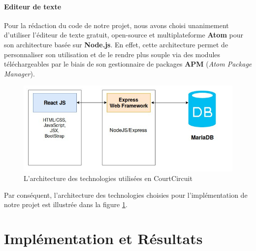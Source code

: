 \documentclass[a4paper,12pt]{report}
\theoremstyle{break}
\theoremstyle{break}
\theoremstyle{break}
\theoremstyle{break}
\theoremstyle{definition}
\theoremstyle{remark}
\begin{document}
\subsubsection{Editeur de texte}
\noindent
Pour la rédaction du code de notre projet, nous avons choisi unanimement d'utiliser l'éditeur de texte gratuit, open-source et multiplateforme \textbf{Atom} pour son architecture basée sur \textbf{Node.js}. En effet, cette architecture permet de personnaliser son utilisation et de le rendre plus souple via des modules téléchargeables par le biais de son gestionnaire de packages \textbf{APM} (\textit{Atom Package Manager}).

\begin{figure}[!ht]
  \centering
  \includegraphics[scale=0.5]{images/website_architecture.jpeg}
  \caption{L'architecture des technologies utilisées en CourtCircuit}
  \label{fig:website_architecture}
\end{figure}

Par conséquent, l'architecture des technologies choisies pour l'implémentation de notre projet est illustrée dans la figure \ref{fig:website_architecture}.
\chapter{Implémentation et Résultats}
\label{chap:implementation_resultats}
\end{document}
